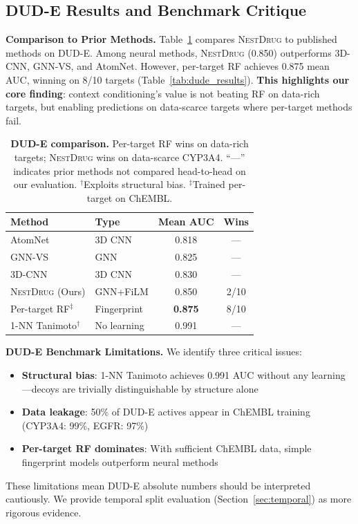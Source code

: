 \documentclass[sigconf,anonymous]{acmart}
\newcommand{\methodname}{\textsc{NestDrug}}
\begin{document}
\subsection{DUD-E Results and Benchmark Critique}

\textbf{Comparison to Prior Methods.} Table~\ref{tab:sota} compares \methodname{} to published methods on DUD-E. Among neural methods, \methodname{} (0.850) outperforms 3D-CNN, GNN-VS, and AtomNet. However, per-target RF achieves 0.875 mean AUC, winning on 8/10 targets (Table~\ref{tab:dude_results}). \textbf{This highlights our core finding}: context conditioning's value is not beating RF on data-rich targets, but enabling predictions on data-scarce targets where per-target methods fail.

\begin{table}[t]
\caption{\textbf{DUD-E comparison.} Per-target RF wins on data-rich targets; \methodname{} wins on data-scarce CYP3A4. ``---'' indicates prior methods not compared head-to-head on our evaluation. $^\dagger$Exploits structural bias. $^\ddagger$Trained per-target on ChEMBL.}
\label{tab:sota}
\centering
\small
\begin{tabular}{@{}llcc@{}}
\toprule
\textbf{Method} & \textbf{Type} & \textbf{Mean AUC} & \textbf{Wins} \\
\midrule
AtomNet \cite{wallach_2015_atomnet} & 3D CNN & 0.818 & --- \\
GNN-VS \cite{lim_2019_gnn_vs} & GNN & 0.825 & --- \\
3D-CNN \cite{ragoza_2017_3dcnn} & 3D CNN & 0.830 & --- \\
\methodname{} (Ours) & GNN+FiLM & 0.850 & 2/10 \\
Per-target RF$^\ddagger$ & Fingerprint & \textbf{0.875} & 8/10 \\
\midrule
1-NN Tanimoto$^\dagger$ & No learning & 0.991 & --- \\
\bottomrule
\end{tabular}
\end{table}

\textbf{DUD-E Benchmark Limitations.} We identify three critical issues:
\begin{itemize}[noitemsep,topsep=0pt]
\item \textbf{Structural bias}: 1-NN Tanimoto achieves 0.991 AUC without any learning---decoys are trivially distinguishable by structure alone \cite{wallach_2018_dude_bias}
\item \textbf{Data leakage}: 50\% of DUD-E actives appear in ChEMBL training (CYP3A4: 99\%, EGFR: 97\%)
\item \textbf{Per-target RF dominates}: With sufficient ChEMBL data, simple fingerprint models outperform neural methods
\end{itemize}
These limitations mean DUD-E absolute numbers should be interpreted cautiously. We provide temporal split evaluation (Section~\ref{sec:temporal}) as more rigorous evidence.
\end{document}
